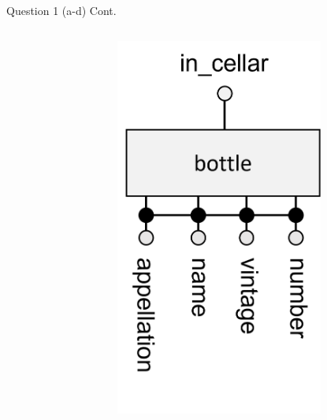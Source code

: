 \begin{frame}[fragile]{Question 1 (a-d) Cont.}
\begin{columns}
\begin{figure}
	\end{figure}
	\begin{figure}
		\includegraphics[width=0.8\textwidth, trim=0 1.5cm 0 0.3cm, clip]{t4/images/bottle_entity_3fk.png}
	\end{figure}
\end{columns}
\end{frame}

